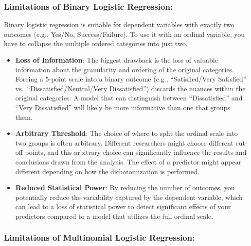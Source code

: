 \documentclass[
  letterpaper,
  DIV=11,
  numbers=noendperiod]{scrartcl}
\begin{document}
\hypertarget{limitations-of-binary-logistic-regression}{%
\subsubsection*{Limitations of Binary Logistic
Regression:}\label{limitations-of-binary-logistic-regression}}

Binary logistic regression is suitable for dependent variables with
exactly two outcomes (e.g., Yes/No, Success/Failure). To use it with an
ordinal variable, you have to collapse the multiple ordered categories
into just two.

\begin{itemize}
\item
  \textbf{Loss of Information}: The biggest drawback is the loss of
  valuable information about the granularity and ordering of the
  original categories. Forcing a 5-point scale into a binary outcome
  (e.g., ``Satisfied/Very Satisfied'' vs.~``Dissatisfied/Neutral/Very
  Dissatisfied'') discards the nuances within the original categories. A
  model that can distinguish between ``Dissatisfied'' and ``Very
  Dissatisfied'' will likely be more informative than one that groups
  them.
\item
  \textbf{Arbitrary Threshold}: The choice of where to split the ordinal
  scale into two groups is often arbitrary. Different researchers might
  choose different cut-off points, and this arbitrary choice can
  significantly influence the results and conclusions drawn from the
  analysis. The effect of a predictor might appear different depending
  on how the dichotomization is performed.
\item
  \textbf{Reduced Statistical Power}: By reducing the number of
  outcomes, you potentially reduce the variability captured by the
  dependent variable, which can lead to a loss of statistical power to
  detect significant effects of your predictors compared to a model that
  utilizes the full ordinal scale.
\end{itemize}

\hypertarget{limitations-of-multinomial-logistic-regression}{%
\subsubsection*{Limitations of Multinomial Logistic
Regression:}\label{limitations-of-multinomial-logistic-regression}}
\end{document}
